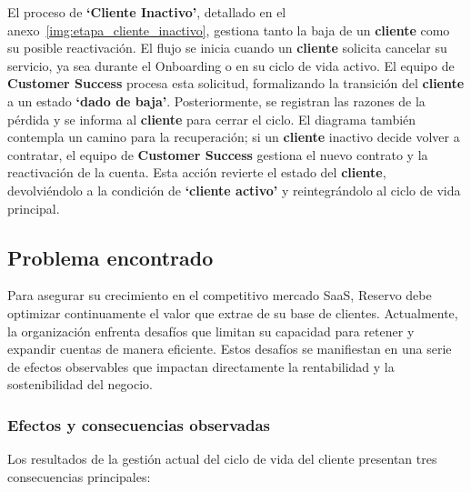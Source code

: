 El proceso de \textbf{`Cliente Inactivo'}, detallado en el anexo~\ref{img:etapa_cliente_inactivo}, gestiona tanto la baja de un \textbf{cliente} como su posible reactivación. El flujo se inicia cuando un \textbf{cliente} solicita cancelar su servicio, ya sea durante el Onboarding o en su ciclo de vida activo. El equipo de \textbf{Customer Success} procesa esta solicitud, formalizando la transición del \textbf{cliente} a un estado \textbf{`dado de baja'}. Posteriormente, se registran las razones de la pérdida y se informa al \textbf{cliente} para cerrar el ciclo. El diagrama también contempla un camino para la recuperación; si un \textbf{cliente} inactivo decide volver a contratar, el equipo de \textbf{Customer Success} gestiona el nuevo contrato y la reactivación de la cuenta. Esta acción revierte el estado del \textbf{cliente}, devolviéndolo a la condición de \textbf{`cliente activo'} y reintegrándolo al ciclo de vida principal.

\subsection{Problema encontrado}
Para asegurar su crecimiento en el competitivo mercado SaaS, Reservo debe optimizar continuamente el valor que extrae de su base de clientes. Actualmente, la organización enfrenta desafíos que limitan su capacidad para retener y expandir cuentas de manera eficiente. Estos desafíos se manifiestan en una serie de efectos observables que impactan directamente la rentabilidad y la sostenibilidad del negocio.

\subsubsection{Efectos y consecuencias observadas}
Los resultados de la gestión actual del ciclo de vida del cliente presentan tres consecuencias principales:


